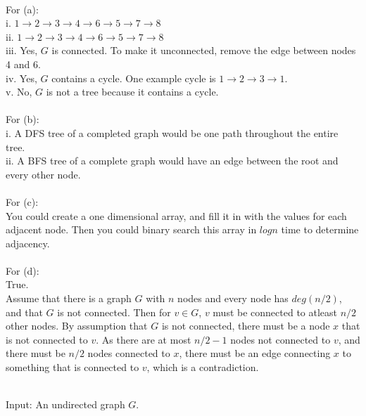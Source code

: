 \documentclass{assignment}
\begin{document}
\begin{problemlist}
\pbitem
\begin{problem}
\end{problem}
\begin{answer}
\\
For (a):\\
i. $1\rightarrow 2\rightarrow 3\rightarrow 4\rightarrow 6\rightarrow 5\rightarrow 7\rightarrow 8$\\
ii. $1\rightarrow 2\rightarrow 3\rightarrow 4\rightarrow 6\rightarrow 5\rightarrow 7\rightarrow 8$\\
iii. Yes, $G$ is connected. To make it unconnected, remove the edge between nodes 4 and 6.\\
iv. Yes, $G$ contains a cycle. One example cycle is $1\rightarrow 2\rightarrow 3\rightarrow 1$.\\
v. No, $G$ is not a tree because it contains a cycle.\\
\\For (b):\\
i. A DFS tree of a completed graph would be one path throughout the entire tree.\\
ii. A BFS tree of a complete graph would have an edge between the root and every other node.\\
\\For (c):\\
You could create a one dimensional array, and fill it in with the values for each adjacent node. Then you could binary search this array in $logn$ time to determine adjacency.\\
\\For (d):\\
True.\\
Assume that there is a graph $G$ with $n$ nodes and every node has $deg(n/2)$, and that $G$ is not connected. Then for $v\in G$, $v$ must be connected to atleast $n/2$ other nodes. By assumption that $G$ is not connected, there must be a node $x$ that is not connected to $v$. As there are at most $n/2 -1$ nodes not connected to $v$, and there must be $n/2$ nodes connected to $x$, there must be an edge connecting $x$ to something that is connected to $v$, which is a contradiction.\\
\end{answer}
\clearpage
\pbitem
\begin{problem}
\end{problem}
\begin{answer}
\\
Input: An undirected graph $G$.\\

\end{answer}
\end{problemlist}
\end{document}

